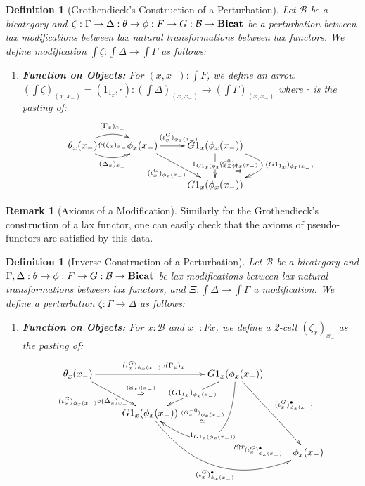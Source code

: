 \documentclass{article}
\numberwithin{equation}{section}
\theoremstyle{definition}
\newtheorem{remark}[equation]{Remark}
\theoremstyle{plain}
\newtheorem{definition}[equation]{Definition}
\newcommand{\Bicat}{\textnormal{\textbf{Bicat}}}
\begin{document}
\begin{definition}[Grothendieck's Construction of a Perturbation] Let $\mathcal{B}$ be a bicategory and $\zeta: \Gamma \to \Delta: \theta \to \phi: F \to G: \mathcal{B} \to \Bicat$ be a perturbation between lax modifications between lax natural transformations between lax functors. We define modification $\int \zeta: \int \Delta \to \int \Gamma$ as follows:
	\begin{enumerate}
		\item \textbf{Function on Objects:} For $(x,x_-):\int F$, we define an arrow $(\int \zeta)_{(x, x_-)} = (1_{1_x}, \square) : (\int \Delta)_{(x,x_-)} \to (\int \Gamma)_{(x,x_-)}$ where $\square$ is the pasting of:
		\[\vcenter{\xymatrix{
				\theta_x(x_-) \ar@/^1pc/[r]^{(\Gamma_x)_{x_-}} \ar@/_1pc/[r]_{(\Delta_x)_{x_-}} \ar@{}[r]|{\Uparrow(\zeta_x)_{x_-}} & \phi_x(x_-) \ar[dr]_{(\iota^G_x)_{\phi_x(x_-)}} \ar[r]^{(\iota^G_x)_{\phi_x(x_-)}} & G1_x(\phi_x(x_-)) \ar[d]|{1_{G1_x(\phi_x(x_-))}} \ar@/^2pc/@{{}{ }{}}[d]|{\overset{(G^0_x)_{\phi_x(x_-)}}{\Rightarrow}} \ar@/^4pc/[d]^{(G1_{1_x})_{\phi_x(x_-)}}\\
				&& G1_x(\phi_x(x_-))
		}}\]
	\end{enumerate}
\end{definition}

\begin{remark}[Axioms of a Modification] Similarly for the Grothendieck's construction of a lax functor, one can easily check that the axioms of pseudo-functors are satisfied by this data.
\end{remark}

\begin{definition}[Inverse Construction of a Perturbation] Let $\mathcal{B}$ be a bicategory and $\Gamma, \Delta: \theta \to \phi: F \to G: \mathcal{B} \to \Bicat$ be lax modifications between lax natural transformations between lax functors, and $\Xi: \int \Delta \to \int \Gamma$ a modification. We define a perturbation $\zeta: \Gamma \to \Delta$ as follows:
	\begin{enumerate}
		\item \textbf{Function on Objects:} For $x: \mathcal{B}$ and $x_-: Fx$, we define a 2-cell $(\zeta_x)_{x_-}$ as the pasting of:
		\[\xymatrix{
			\theta_x(x_-) \ar[rr]^{(\iota^G_x)_{\phi_x(x_-)}\circ (\Gamma_x)_{x_-}} \ar[dr]_{(\iota^G_x)_{\phi_x(x_-)}\circ (\Delta_x)_{x_-}} \ar@{}[drr]|(0.4){\overset{(\Xi_x)(x_-)}{\Rightarrow}} && G1_x(\phi_x(x_-)) \ar[dl]|{(G1_{1_x})_{\phi_x(x_-)}} \ar@/^2pc/@{{}{ }{}}[dl]|{\overset{(G^{-0}_x)_{\phi_x(x_-)}}{\simeq}} \ar@/^4pc/[dl]|{1_{G1_x(\phi_x(x_-))}} \ar[ddr]^{(\iota^G_x)^{\bullet}_{\phi_x(x_-)}} \\
			& G1_x(\phi_x(x_-)) \ar@/_3pc/[drr]_{(\iota^G_x)^{\bullet}_{\phi_x(x_-)}} &\\
			&&& \phi_x(x_-) \ar@{{}{ }{}}@/^1pc/[ull]|(0.3){\wr \Uparrow r_{(\iota^G_x)^{\bullet}_{\phi_x(x_-)}}}
		}\]
	\end{enumerate}
\end{definition}
\end{document}
